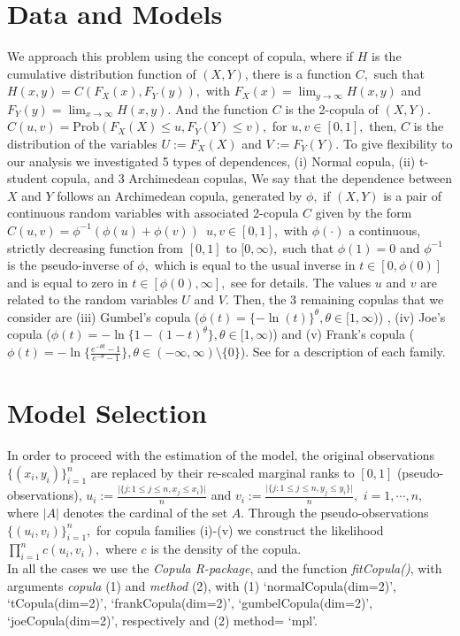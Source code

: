 \documentclass{aip-cp}
\begin{document}
\section{Data and Models}\label{model}
We approach this problem using the concept of copula, where if $H$ is the cumulative distribution function of $(X,Y)$, there is a function $C,$ such that $H(x,y)=C(F_X(x), F_Y(y)), $  with $F_X(x)=\lim_{y \to \infty}H(x,y)$ and $F_Y(y)=\lim_{x \to \infty}H(x, y).$ And the function $C$ is the 2-copula of $(X,Y).$ $C(u,v)=\mbox{Prob}(F_X(X) \leq u, F_Y(Y) \leq v),$ for $u, v \in [0,1],$ then, $C$ is the distribution of the variables $U:=F_X(X)$ and $V:=F_Y(Y).$ To give flexibility to our analysis we investigated 5 types of dependences, (i) Normal copula, (ii) t-student copula, and 3 Archimedean copulas,  We say that the dependence between $X$ and $Y$ follows an Archimedean copula, generated by $\phi,$ if $(X,Y)$ is a pair of continuous random variables with associated 2-copula $C$ given by the form
$C(u,v )=\phi^{-1}(\phi(u)+\phi(v)) \,\,\,u,v \in [0,1], $
with $\phi(\cdot)$ a continuous, strictly decreasing function from $[0,1]$ to $[0,\infty),$ such that $\phi(1)=0$ and $\phi^{-1}$ is the pseudo-inverse of $\phi, $ which is equal to the usual inverse in $t \in [0,\phi(0)]$ and is equal to zero in $t \in [\phi(0), \infty],$ see \cite{Nelsen2007} for details. The values $u$ and $v$ are related to the random variables $U$ and $V.$ Then, the 3 remaining copulas that we consider are (iii) Gumbel's copula ($\phi(t)=\{-\ln(t)\}^{\theta}, \theta \in [1, \infty) $) , (iv) Joe's copula ($\phi(t)=-\ln\{1-(1-t)^{\theta}\}, \theta \in [1, \infty)$) and (v) Frank's copula ($\phi(t)=-\ln\{\frac{e^{-\theta t}-1}{e^{-\theta}-1}\}, \theta \in (-\infty, \infty) \setminus \{0\}$). See \cite{Nelsen2007} for a description of each family.
\section{Model Selection}
In order to proceed with the estimation of the model, the original observations $\{(x_{i}, y_{i})\}_{i=1}^n$ are replaced by their re-scaled marginal ranks to $[0,1]$ (pseudo-observations), $u_i := \frac{\vert \{j: 1 \leq j \leq n, x_{j} \leq x_{i} \} \vert }{n} $ and $v_i:=\frac{\vert \{j: 1\leq j \leq n, y_{j} \leq y_{i} \} \vert }{n},\,\, i=1,\cdots,n,$ where $|A|$ denotes the cardinal of the set $A.$ Through the pseudo-observations $\{(u_i,v_i)\}_{i=1}^n,$ for copula families (i)-(v) we construct the likelihood 
$\prod_{i=1}^n c (u_i, v_i),$ where $c$ is the density of the copula.\\
In all the cases we use the {\it{Copula R-package}}, and the function {\it{fitCopula()}}, with arguments \textit{copula} (1) and \textit{method} (2), with (1) `normalCopula(dim=2)',  `tCopula(dim=2)',  `frankCopula(dim=2)',  `gumbelCopula(dim=2)', `joeCopula(dim=2)', respectively  and (2) method= `mpl'.
\end{document}
